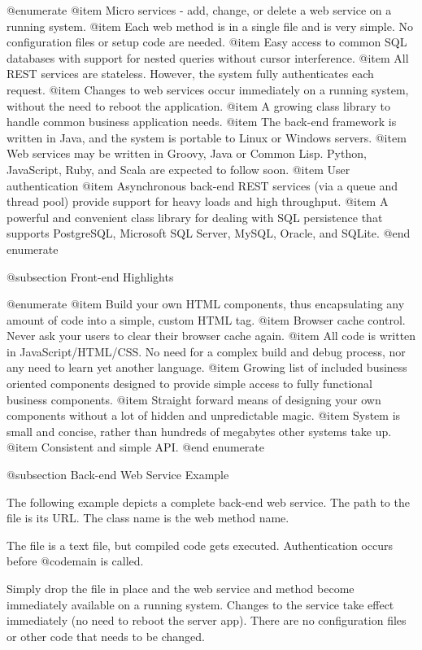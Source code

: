 @enumerate
@item
Micro services - add, change, or delete a web service on a running system.
@item
Each web method is in a single file and is very simple.  No
configuration files or setup code are needed.
@item
Easy access to common SQL databases with support for nested queries
without cursor interference.
@item
All REST services are stateless.  However, the system fully
authenticates each request.
@item
Changes to web services occur immediately on a running system,
without the need to reboot the application.
@item
A growing class library to handle common business application needs.
@item
The back-end framework is written in Java, and the system is portable to
Linux or Windows servers.
@item
Web services may be written in Groovy, Java or Common Lisp.  Python,
JavaScript, Ruby, and Scala are expected to follow soon.
@item
User authentication
@item
Asynchronous back-end REST services (via a queue and thread pool)
provide support for heavy loads and high throughput.
@item
A powerful and convenient class library for dealing with SQL persistence that
supports PostgreSQL, Microsoft SQL Server, MySQL, Oracle, and SQLite.
@end enumerate


@subsection Front-end Highlights

@enumerate
@item
Build your own HTML components, thus encapsulating any amount of code
into a simple, custom HTML tag.
@item
Browser cache control.  Never ask your users to clear their browser cache again.
@item
All code is written in JavaScript/HTML/CSS.  No need for a complex build
and debug process, nor any need to learn yet another language.
@item
Growing list of included business oriented components designed to
provide simple access to fully functional business components.
@item
Straight forward means of designing your own components without a lot
of hidden and unpredictable magic.
@item
System is small and concise, rather than hundreds of megabytes other
systems take up.
@item
Consistent and simple API.
@end enumerate

@subsection Back-end Web Service Example


The following example depicts a complete back-end web service.  The
path to the file is its URL.  The class name is the web method name.

The file is a text file, but compiled code gets executed.
Authentication occurs before @code{main} is called.

Simply drop the file in place and the web service and method become
immediately available on a running system.  Changes to the service
take effect immediately (no need to reboot the server app).  There are
no configuration files or other code that needs to be changed.

